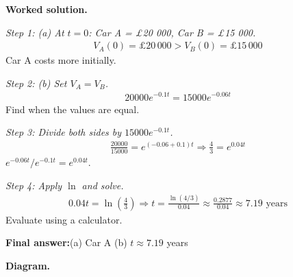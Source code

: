 \documentclass[11pt]{article}
\begin{document}
\textbf{Worked solution.}

\textit{Step 1: (a) At \( t = 0 \): Car A = \pounds 20 000, Car B = \pounds 15 000.}
\[\begin{gathered}
V_A(0) = \pounds 20\,000 > V_B(0) = \pounds 15\,000
\end{gathered}\]
Car A costs more initially.

\textit{Step 2: (b) Set \( V_A = V_B \).}
\[\begin{gathered}
20000e^{-0.1t} = 15000e^{-0.06t}
\end{gathered}\]
Find when the values are equal.

\textit{Step 3: Divide both sides by \( 15000e^{-0.1t} \).}
\[\begin{gathered}
\frac{20000}{15000} = e^{(-0.06+0.1)t} \Rightarrow \frac{4}{3} = e^{0.04t}
\end{gathered}\]
\( e^{-0.06t}/e^{-0.1t} = e^{0.04t} \).

\textit{Step 4: Apply \( \ln \) and solve.}
\[\begin{gathered}
0.04t = \ln\!\left(\frac{4}{3}\right) \Rightarrow t = \frac{\ln(4/3)}{0.04} \approx \frac{0.2877}{0.04} \approx 7.19 \text{ years}
\end{gathered}\]
Evaluate using a calculator.

\begin{answerbox}
\textbf{Final answer:}\quad (a) Car A \quad  (b) \(\displaystyle  t \approx 7.19 \) years
\end{answerbox}
\textbf{Diagram.}
\end{document}
